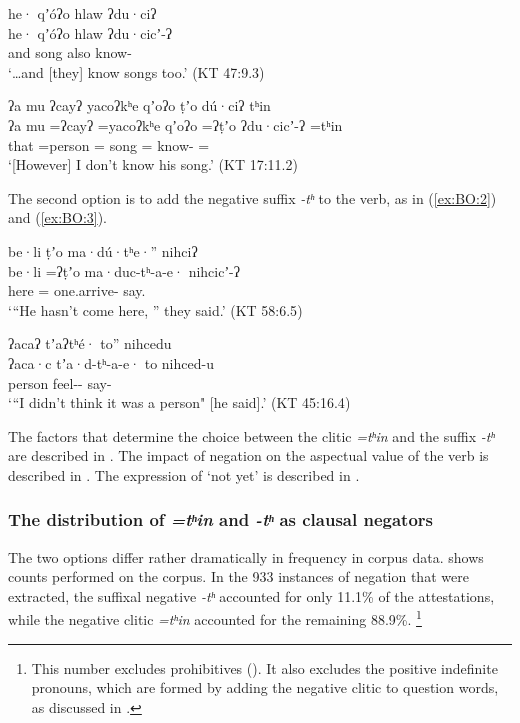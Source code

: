 \documentclass[output=paper,modfonts,nonflat,colorlinks,citecolor=brown]{langscibook}
\begin{document}
{%
\ea\label{ex:BO:0}
\glll {[\ldots]} he· qʼóʔo hlaw ʔdu·ciʔ\\
    {} he· qʼóʔo hlaw ʔdu·cicʼ-ʔ\\
    {} and song also know-\\
\glt `\ldots and [they] know songs too.' (KT 47:9.3)\\
\z
}%

{%
\ea\label{ex:BO:1}
\glll {[\ldots]} ʔa mu ʔcayʔ yacoʔkʰe qʼoʔo ṭʼo dú·ciʔ tʰin\\
    {} ʔa mu =ʔcayʔ =yacoʔkʰe qʼoʔo =ʔṭʼo ʔdu·cicʼ-ʔ =tʰin\\
    {}  that =person = song = know- =\\
\glt `[However] I don’t know his song.' ({KT 17:11.2})\\
\z
}%

\noindent The second option is to add the negative suffix \textit{-tʰ} to the verb, as in (\ref{ex:BO:2}) and (\ref{ex:BO:3}).

{%
\ea\label{ex:BO:2}
\glll {}be·li ṭʼo ma·dú·tʰe·'' nihciʔ\\
    be·li =ʔṭʼo ma·duc-tʰ-a-e· nihcicʼ-ʔ\\
    here = one.arrive- say.\\
\glt `“He hasn’t come here, ” they said.' ({KT 58:6.5})\\
\z
}%

\ea\label{ex:BO:3}
\glll {}ʔacaʔ tʼaʔtʰé· to'' nihcedu\\
    ʔaca·c tʼa·d-tʰ-a-e· to nihced-u\\
    person feel--  say-\\
\glt `“I didn’t think it was a person" [he said].' ({KT 45:16.4})\\
\z

\noindent The factors that determine the choice between the clitic \textit{=tʰin} and the suffix \textit{-tʰ} are described in . The impact of negation on the aspectual value of the verb is described in . The expression of ‘not yet' is described in .

\subsubsection{The distribution of \textit{=tʰin} and \textit{-tʰ} as clausal negators}
\label{sec:BO:distr}
The two options differ rather dramatically in frequency in corpus data.  shows counts performed on the corpus.
In the 933 instances of negation that were extracted, the suffixal negative \textit{-tʰ} accounted for only 11.1\% of the attestations, while the negative clitic \textit{=tʰin} accounted for the remaining 88.9\%.%
\footnote{This number excludes prohibitives (). It also excludes the positive indefinite pronouns, which are formed by adding the negative clitic to question words, as discussed in .
}
\end{document}
